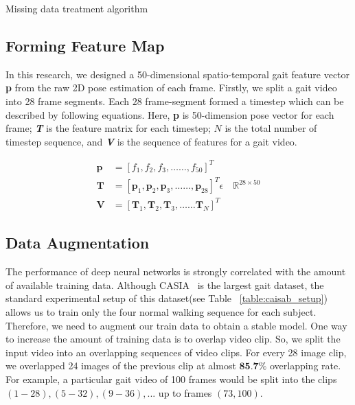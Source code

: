 \begin{algorithm}
	\caption{Missing data treatment algorithm}
	\label{alg1}
	\begin{algorithmic}
		
	\end{algorithmic}
\end{algorithm}

\subsection{Forming Feature Map}
In this research, we designed a 50-dimensional spatio-temporal gait feature vector \textbf{p} from the raw 2D pose estimation of each frame.  Firstly, we split a gait video into 28 frame segments. Each $ 28 $ frame-segment formed a timestep which can be described by following equations. Here, \textbf{p} is 50-dimension pose vector for each frame; \textit{\textbf{T}} is the feature matrix for each timestep; $ N $ is the total number of timestep sequence, and \textit{\textbf{V}} is the sequence of features for a gait video. 

\begin{equation}
\label{equ:feature_preprocess}
\begin{split}
\boldsymbol{p} &= {[f_1, f_2, f_3, \ldots \ldots, f_{50}]}^T \\
\boldsymbol {T} &= {[\boldsymbol p_1, \boldsymbol p_2, \boldsymbol p_3,  \ldots \ldots, \boldsymbol p_{28}]}^T \epsilon \quad \mathbb {R}^{28\times 50}\\
\boldsymbol V &= {[\boldsymbol T_1, \boldsymbol T_2, \boldsymbol T_3,  \ldots \ldots \boldsymbol T_{N}]}^T 
\end{split}
\end{equation}


\subsection{Data Augmentation}
The performance of deep neural networks is strongly correlated with the amount of available training data.  Although CASIA~\cite{Yu_06} is the largest gait dataset, the standard experimental setup of this dataset(see Table ~\ref{table:caisab_setup}) allows us to train only the four normal walking sequence for each subject. Therefore, we need to augment our train data to obtain a stable model.  
One way to increase the amount of training data is to overlap video clip. So, we split the input video into an overlapping sequences of video clips. For every 28 image clip, we overlapped 24 images of the previous clip at almost $ \textbf{85.7\%} $ overlapping rate. For example, a particular gait video of 100 frames would be split into the clips $(1-28), (5-32), (9-36), ...$ up to frames $(73, 100)$. 

